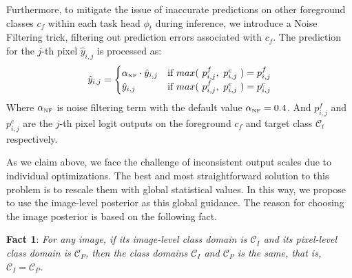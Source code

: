 Furthermore, to mitigate the issue of inaccurate predictions on other foreground classes \(c_f\) within each task head $\phi_t$ during inference, we introduce a Noise Filtering trick, filtering out prediction errors associated with \(c_f\). The prediction for the \( j \)-th pixel \(\hat{y}_{i,j}\) is processed as:
\begin{equation}
\hat{y}_{i,j}=\begin{cases}\alpha_{\text{\tiny NF}} \cdot \hat{y}_{i,j}&\text{if} ~max(~p^f_{i,j},~p^c_{i,j}~)=p^f_{i,j}\\\hat{y}_{i,j}&\text{if}~max(~p^f_{i,j},~p^c_{i,j}~)=p^c_{i,j}\end{cases}
\end{equation}
Where \(\alpha_{\text{\tiny NF}}\) is noise filtering term with the default value \(\alpha_{\text{\tiny NF}}=0.4\). And \(p^f_{i,j}\) and \(p^c_{i,j}\) are the \( j \)-th pixel logit outputs on the foreground \(c_f\) and target class $\mathcal{C}_t$ respectively.

\iffalse
As we claim above, we face the challenge of inconsistent output scales due to individual optimizations. The best and most straightforward solution to this problem is to rescale them with global statistical values. In this way, we propose to use the image-level posterior as this global guidance. The reason for choosing the image posterior is based on the following fact.

\textbf{Fact 1}: \textit{For any image, if its image-level class domain is $\mathcal{C}_I$ and its pixel-level class domain is $\mathcal{C}_P$, then the class domains $\mathcal{C}_I$ and $\mathcal{C}_P$ is the same, that is, $\mathcal{C}_I = \mathcal{C}_P$.}


